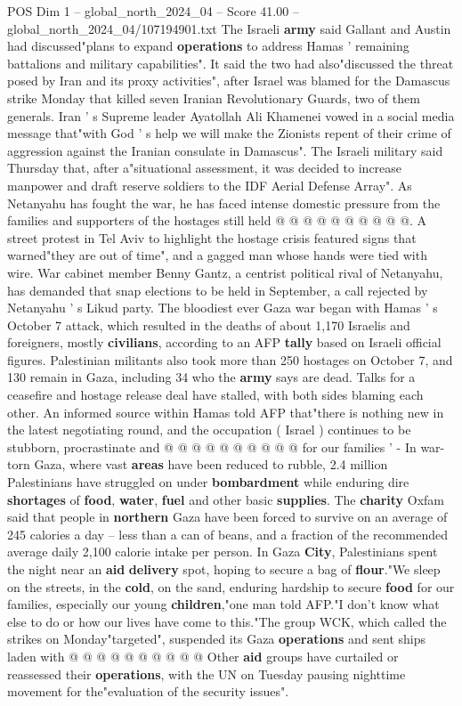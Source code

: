 \begin{textsample}{POS Dim 1 – global\_north\_2024\_04 – Score 41.00 – global\_north\_2024\_04/107194901.txt}
The Israeli \textbf{army} said Gallant and Austin had discussed"plans to expand \textbf{operations} to address Hamas ' remaining battalions and military capabilities".
It said the two had also"discussed the threat posed by Iran and its proxy activities", after Israel was blamed for the Damascus strike Monday that killed seven Iranian Revolutionary Guards, two of them generals.
Iran ' s Supreme leader Ayatollah Ali Khamenei vowed in a social media message that"with God ' s help we will make the Zionists repent of their crime of aggression against the Iranian consulate in Damascus".
The Israeli military said Thursday that, after a"situational assessment, it was decided to increase manpower and draft reserve soldiers to the IDF Aerial Defense Array".
As Netanyahu has fought the war, he has faced intense domestic pressure from the families and supporters of the hostages still held @ @ @ @ @ @ @ @ @ @.
A street protest in Tel Aviv to highlight the hostage crisis featured signs that warned"they are out of time", and a gagged man whose hands were tied with wire.
War cabinet member Benny Gantz, a centrist political rival of Netanyahu, has demanded that snap elections to be held in September, a call rejected by Netanyahu ' s Likud party.
The bloodiest ever Gaza war began with Hamas ' s October 7 attack, which resulted in the deaths of about 1,170 Israelis and foreigners, mostly \textbf{civilians}, according to an AFP \textbf{tally} based on Israeli official figures.
Palestinian militants also took more than 250 hostages on October 7, and 130 remain in Gaza, including 34 who the \textbf{army} says are dead.
Talks for a ceasefire and hostage release deal have stalled, with both sides blaming each other.
An informed source within Hamas told AFP that"there is nothing new in the latest negotiating round, and the occupation ( Israel ) continues to be stubborn, procrastinate and @ @ @ @ @ @ @ @ @ @ for our families ' - In war-torn Gaza, where vast \textbf{areas} have been reduced to rubble, 2.4 million Palestinians have struggled on under \textbf{bombardment} while enduring dire \textbf{shortages} of \textbf{food}, \textbf{water}, \textbf{fuel} and other basic \textbf{supplies}.
The \textbf{charity} Oxfam said that people in \textbf{northern} Gaza have been forced to survive on an average of 245 calories a day -- less than a can of beans, and a fraction of the recommended average daily 2,100 calorie intake per person.
In Gaza \textbf{City}, Palestinians spent the night near an \textbf{aid} \textbf{delivery} spot, hoping to secure a bag of \textbf{flour}."We sleep on the streets, in the \textbf{cold}, on the sand, enduring hardship to secure \textbf{food} for our families, especially our young \textbf{children},"one man told AFP."I don't know what else to do or how our lives have come to this."The group WCK, which called the strikes on Monday"targeted", suspended its Gaza \textbf{operations} and sent ships laden with @ @ @ @ @ @ @ @ @ @ Other \textbf{aid} groups have curtailed or reassessed their \textbf{operations}, with the UN on Tuesday pausing nighttime movement for the"evaluation of the security issues".

\end{textsample}

